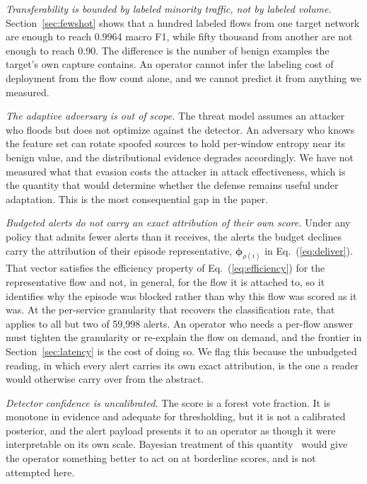 \documentclass{ieeeaccess}
\begin{document}
\emph{Transferability is bounded by labeled minority traffic, not by labeled volume.} Section~\ref{sec:fewshot} shows that a hundred labeled flows from one target network are enough to reach 0.9964 macro F1, while fifty thousand from another are not enough to reach 0.90. The difference is the number of benign examples the target's own capture contains. An operator cannot infer the labeling cost of deployment from the flow count alone, and we cannot predict it from anything we measured.

\emph{The adaptive adversary is out of scope.} The threat model assumes an attacker who floods but does not optimize against the detector. An adversary who knows the feature set can rotate spoofed sources to hold per-window entropy near its benign value, and the distributional evidence degrades accordingly. We have not measured what that evasion costs the attacker in attack effectiveness, which is the quantity that would determine whether the defense remains useful under adaptation. This is the most consequential gap in the paper.

\emph{Budgeted alerts do not carry an exact attribution of their own score.} Under any policy that admits fewer alerts than it receives, the alerts the budget declines carry the attribution of their episode representative, $\boldsymbol{\phi}_{\rho(i)}$ in Eq.~(\ref{eq:deliver}). That vector satisfies the efficiency property of Eq.~(\ref{eq:efficiency}) for the representative flow and not, in general, for the flow it is attached to, so it identifies why the episode was blocked rather than why this flow was scored as it was. At the per-service granularity that recovers the classification rate, that applies to all but two of 59,998 alerts. An operator who needs a per-flow answer must tighten the granularity or re-explain the flow on demand, and the frontier in Section~\ref{sec:latency} is the cost of doing so. We flag this because the unbudgeted reading, in which every alert carries its own exact attribution, is the one a reader would otherwise carry over from the abstract.

\emph{Detector confidence is uncalibrated.} The score is a forest vote fraction. It is monotone in evidence and adequate for thresholding, but it is not a calibrated posterior, and the alert payload presents it to an operator as though it were interpretable on its own scale. Bayesian treatment of this quantity~\cite{swaminathan2022bayesian} would give the operator something better to act on at borderline scores, and is not attempted here.
\end{document}
